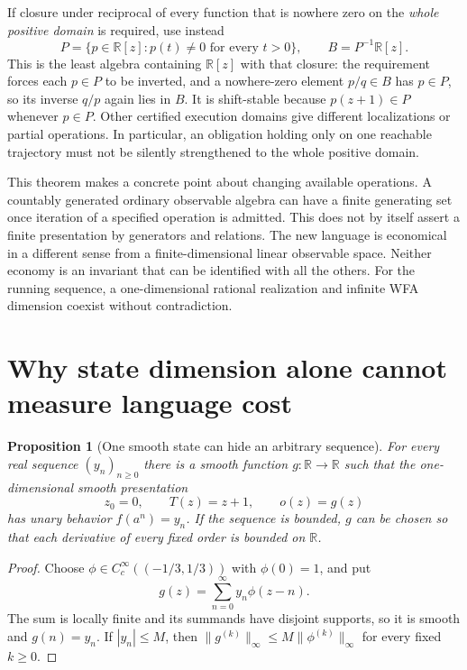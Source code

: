 \documentclass[11pt]{article}
\newtheorem{proposition}[theorem]{Proposition}
\theoremstyle{definition}
\begin{document}
If closure under reciprocal of every function that is nowhere zero on the
\emph{whole positive domain} is required, use instead
\[
 P=\{p\in\mathbb R[z]:p(t)\ne0\text{ for every }t>0\},
 \qquad B=P^{-1}\mathbb R[z].
\]
This is the least algebra containing $\mathbb R[z]$ with that closure:
the requirement forces each $p\in P$ to be inverted, and a nowhere-zero
element $p/q\in B$ has $p\in P$, so its inverse $q/p$ again lies in $B$.
It is shift-stable because $p(z+1)\in P$ whenever $p\in P$.
Other certified execution domains give different localizations or partial
operations. In particular, an obligation holding only on one reachable
trajectory must not be silently strengthened to the whole positive domain.

This theorem makes a concrete point about changing available operations.
A countably generated ordinary observable algebra can have a finite
generating set once iteration of a specified operation is admitted. This
does not by itself assert a finite presentation by generators and relations. The new
language is economical in a different sense from a finite-dimensional linear
observable space. Neither economy is an invariant that can be identified
with all the others. For the running sequence, a one-dimensional
rational realization and infinite WFA dimension coexist without contradiction.

\section{Why state dimension alone cannot measure language cost}
\label{sec:cost}

\begin{proposition}[One smooth state can hide an arbitrary sequence]
\label{lr:smooth-one-state}
For every real sequence $(y_n)_{n\geq0}$ there is a smooth function
$g:\mathbb R\to\mathbb R$ such that the one-dimensional smooth
presentation
\[
 z_0=0,\qquad T(z)=z+1,\qquad o(z)=g(z)
\]
has unary behavior $f(a^n)=y_n$. If the sequence is bounded, $g$ can
be chosen so that each derivative of every fixed order is bounded on
$\mathbb R$.
\end{proposition}
\begin{proof}
Choose $\phi\in C_c^\infty((-1/3,1/3))$ with $\phi(0)=1$, and put
\[
 g(z)=\sum_{n=0}^{\infty}y_n\phi(z-n).
\]
The sum is locally finite and its summands have disjoint supports, so
it is smooth and $g(n)=y_n$. If $|y_n|\leq M$, then
$\|g^{(k)}\|_\infty\leq M\|\phi^{(k)}\|_\infty$ for every fixed
$k\geq0$.
\end{proof}
\end{document}
